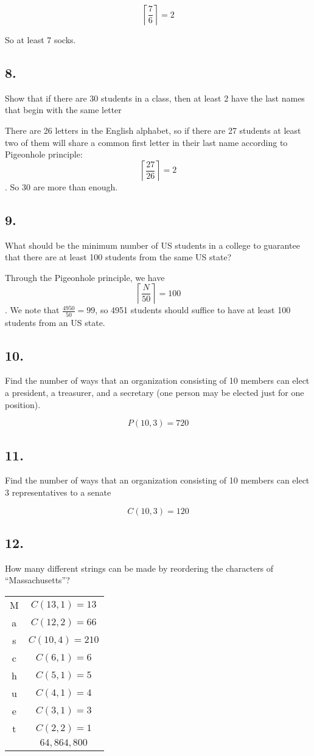 \documentclass{article}
\begin{document}
$$\left \lceil{\frac{7}{6}}\right \rceil = 2$$

So at least 7 socks.

\subsection*{8.}
Show that if there are 30 students in a class, then at least 2 have the last names that begin with the same letter

There are 26 letters in the English alphabet, so if there are 27 students at least two of them will share a common first letter in their last name according to Pigeonhole principle: 
$$ \left \lceil{\frac{27}{26}} \right \rceil = 2$$. So 30 are more than enough.

\subsection*{9.}
What should be the minimum number of US students in a college to guarantee that there are at least 100 students from the same US state? 

Through the Pigeonhole principle, we have $$ \left \lceil{\frac{N}{50}} \right \rceil = 100$$. We note that $\frac{4950}{50} = 99$, so 4951 students should suffice to have at least 100 students from an US state.

\subsection*{10.}
Find the number of ways that an organization consisting of 10 members can elect a president, a
treasurer, and a secretary (one person may be elected just for one position).

$$P(10,3) = 720$$

\subsection*{11.}
Find the number of ways that an organization consisting of 10 members can elect 3
representatives to a senate

$$C(10,3) = 120$$

\subsection*{12.}
How many different strings can be made by reordering the characters of “Massachusetts”?

\begin{center}
\begin{tabular}{c|c}
    M & $C(13, 1) = 13$ \\
    a & $C(12, 2) = 66$ \\
    s & $C(10, 4) = 210$ \\
    c & $C(6, 1) = 6$ \\
    h & $C(5, 1) = 5$ \\
    u & $C(4, 1) = 4$ \\
    e & $C(3, 1) = 3$ \\
    t & $C(2, 2) = 1 $ \\ \hline
    & $64,864,800$
\end{tabular}
\end{center}
\end{document}

